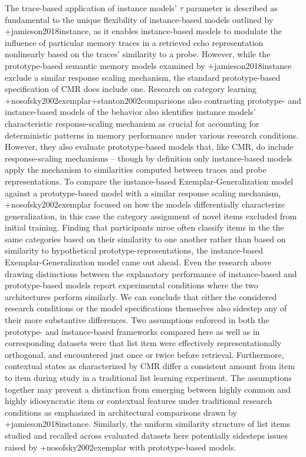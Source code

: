 {}The trace-based application of instance models' $\tau$ parameter is described as fundamental to the unique flexibility of instance-based models outlined by +{}{}{jamieson2018instance}, as it enables instance-based models to modulate the influence of particular memory traces in a retrieved echo representation nonlinearly based on the traces' similarity to a probe. However, while the prototype-based semantic memory models examined by +{}{}{jamieson2018instance} exclude a similar response scaling mechanism, the standard prototype-based specification of CMR does include one. Research on category learning +{}{}{nosofsky2002exemplar}+{}{}{stanton2002comparisons} also contrasting prototype- and instance-based models of the behavior also identifies instance models' characteristic response-scaling mechanism as crucial for accounting for deterministic patterns in memory performance under various research conditions. However, they also evaluate prototype-based models that, like CMR, do include response-scaling mechanisms -- though by definition only instance-based models apply the mechanism to similarities computed between traces and probe representations. To compare the instance-based Exemplar-Generalization model against a prototype-based model with a similar response scaling mechanism, +{}{}{nosofsky2002exemplar} focused on how the models differentially characterize generalization, in this case the category assignment of novel items excluded from initial training. Finding that participants mroe often classify items in the the same categories based on their similarity to one another rather than based on similarity to hypothetical prototype-representations, the instance-based Exemplar-Generalization model came out ahead.\markdownRendererInterblockSeparator
{}Even the research above drawing distinctions between the explanatory performance of instance-based and prototype-based models report experimental conditions where the two architectures perform similarly. We can conclude that either the considered research conditions or the model specifications themselves also sidestep any of their more substantive differences. Two assumptions enforced in both the prototype- and instance-based frameworks compared here as well as in corresponding datasets were that list item were effectively representationally orthogonal, and encountered just once or twice before retrieval. Furthermore, contextual states as characterized by CMR differ a consistent amount from item to item during study in a traditional list learning experiment. The assumptions together may prevent a distinction from emerging between highly common and highly idiosyncratic item or contextual features under traditional research conditions as emphasized in architectural comparisons drawn by +{}{}{jamieson2018instance}. Similarly, the uniform similarity structure of list items studied and recalled across evaluated datasets here potentially sidesteps issues raised by +{}{}{nosofsky2002exemplar} with prototype-based models.\markdownRendererInterblockSeparator
